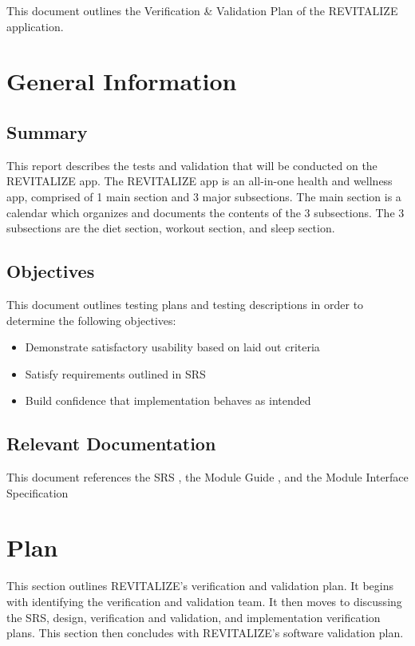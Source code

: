 \documentclass[12pt, titlepage]{article}
\begin{document}
\noindent This document outlines the Verification \& Validation Plan of the REVITALIZE application.

\section{General Information}

\subsection{Summary}

\noindent This report describes the tests and validation that will be conducted on the REVITALIZE app. The REVITALIZE app is an all-in-one health and wellness app, comprised of 1 main section and 3 major subsections. The main section is a calendar which organizes and documents the contents of the 3 subsections. The 3 subsections are the diet section, workout section, and sleep section.

\subsection{Objectives}

\noindent This document outlines testing plans and testing descriptions in order to determine the following objectives: 
\begin{itemize}
	\item Demonstrate satisfactory usability based on laid out criteria
	\item Satisfy requirements outlined in SRS
	\item Build confidence that implementation behaves as intended
\end{itemize}


\subsection{Relevant Documentation}

\noindent This document references the SRS \citet{SRS}, the Module Guide \citet{MG}, and the Module Interface Specification \citet{MIS}


\section{Plan}

This section outlines REVITALIZE's verification and validation plan. It begins with identifying the verification and validation team. It then moves to discussing the SRS, design, verification and validation, and implementation verification plans. This section then concludes with REVITALIZE's software validation plan.
\end{document}
